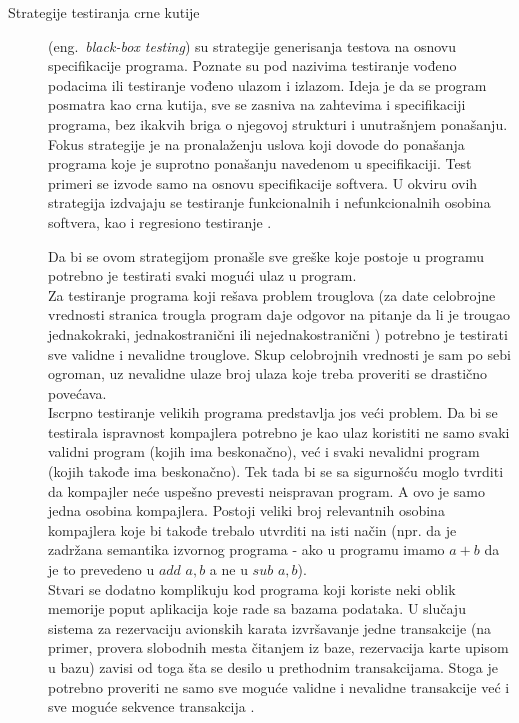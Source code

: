 \documentclass[12pt,oneside]{memoir}
\begin{document}
\begin{description}
\item [Strategije testiranja crne kutije] (eng.~\textit{black-box testing}) su strategije generisanja testova na osnovu specifikacije programa. Poznate su pod nazivima testiranje vođeno podacima ili testiranje vođeno ulazom i izlazom. Ideja je da se program posmatra kao crna kutija, sve se zasniva na zahtevima i specifikaciji programa, bez ikakvih briga o njegovoj strukturi i unutrašnjem ponašanju. Fokus strategije je na pronalaženju uslova koji dovode do ponašanja programa koje je suprotno ponašanju navedenom u specifikaciji. Test primeri se izvode samo na osnovu specifikacije softvera. U okviru ovih strategija izdvajaju se testiranje funkcionalnih i nefunkcionalnih osobina softvera, kao i regresiono testiranje \cite{mvj, ArtOfST, PGtSTD}.

Da bi se ovom strategijom pronašle sve greške koje postoje u programu potrebno je testirati svaki mogući ulaz u program. \\
Za testiranje programa koji rešava problem trouglova (za date celobrojne vrednosti stranica trougla program daje odgovor na pitanje da li je trougao jednakokraki, jednakostranični ili nejednakostranični \cite{schlingloff} %
) potrebno je testirati sve validne i nevalidne trouglove. Skup celobrojnih vrednosti je sam po sebi ogroman, uz nevalidne ulaze broj ulaza koje treba proveriti se drastično povećava.\\
Iscrpno testiranje velikih programa predstavlja jos veći problem. Da bi se testirala ispravnost kompajlera potrebno je kao ulaz koristiti ne samo svaki validni program (kojih ima beskonačno), već i svaki nevalidni program (kojih takođe ima beskonačno). Tek tada bi se sa sigurnošću moglo tvrditi da kompajler neće uspešno prevesti neispravan program. A ovo je samo jedna osobina kompajlera. Postoji veliki broj relevantnih osobina kompajlera koje bi takođe trebalo utvrditi na isti način (npr. da je zadržana semantika izvornog programa - ako u programu imamo $a+b$ da je to prevedeno u $add$ $a, b$ a ne u $sub$ $a, b$). \\
Stvari se dodatno komplikuju kod programa koji koriste neki oblik memorije poput aplikacija koje rade sa bazama podataka. U slučaju sistema za rezervaciju avionskih karata izvršavanje jedne transakcije (na primer, provera slobodnih mesta čitanjem iz baze, rezervacija karte upisom u bazu) zavisi od toga šta se desilo u prethodnim transakcijama. Stoga je potrebno proveriti ne samo sve moguće validne i nevalidne transakcije već i sve moguće sekvence transakcija \cite{ArtOfST}.


\end{description}
\end{document}
